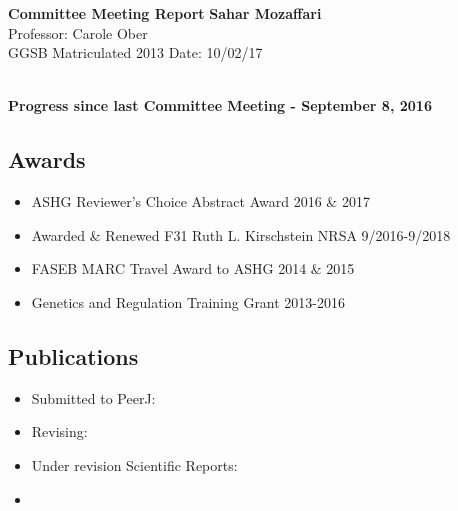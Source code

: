 \documentclass[a4paper, 11pt]{article}
\begin{document}
\noindent
\large\textbf{Committee Meeting Report} \hfill \textbf{Sahar Mozaffari} \\
\normalsize  \hfill Professor: Carole Ober  \\
GGSB Matriculated 2013 \hfill Date: 10/02/17 \\
\noindent\makebox[\linewidth]{\rule{\paperwidth}{0.4pt}}

\large\textbf{\\Progress since last Committee Meeting - September 8, 2016}
\subsection*{Awards}
\begin{itemize}
    \item ASHG Reviewer's Choice Abstract Award  \hfill 2016 \& 2017
    \item Awarded \& Renewed F31 Ruth L. Kirschstein NRSA \hfill 9/2016-9/2018
    \item FASEB MARC Travel Award to ASHG \hfill 2014 \& 2015 
    \item Genetics and Regulation Training Grant \hfill 2013-2016
\end{itemize} 

\subsection*{Publications}
\begin{itemize}
    \item Submitted to PeerJ: 
    \item Revising: 
    \item Under revision Scientific Reports: 
    \item {}
\end{itemize}
\end{document}
